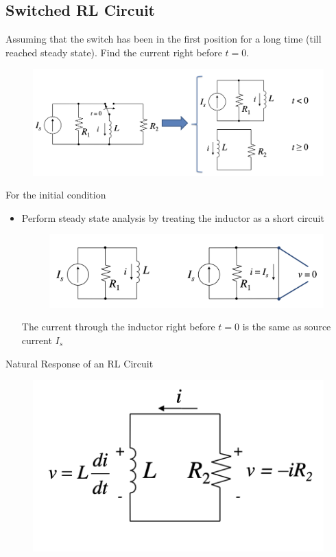         \subsection{Switched RL Circuit}
            Assuming that the switch has been in the first position for a long time (till reached steady state).
            Find the current right before $t=0$.
            \begin{figure}[H]
                \centering
                \includegraphics[width=0.8\linewidth]{chapters/figures/switched_rl.png}
            \end{figure}
            For the initial condition
            \begin{itemize}
                \item Perform steady state analysis by treating the inductor as a short circuit
                    \begin{figure}[H]
                        \centering
                        \includegraphics[width=0.4\linewidth]{chapters/figures/switched_rl_initial_cond.png}
                    \end{figure}
                    The current through the inductor right before $t=0$ is the same as source current $I_s$
            \end{itemize}
            Natural Response of an RL Circuit
            \begin{figure}[H]
                \centering
                \includegraphics[width=0.3\linewidth]{chapters/figures/switched_rl_natural_resp.png}
            \end{figure}
